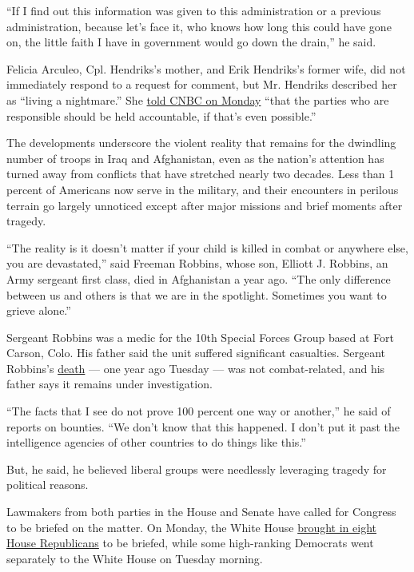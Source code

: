 ``If I find out this information was given to this administration or a
previous administration, because let's face it, who knows how long this
could have gone on, the little faith I have in government would go down
the drain,'' he said.

Felicia Arculeo, Cpl. Hendriks's mother, and Erik Hendriks's former
wife, did not immediately respond to a request for comment, but Mr.
Hendriks described her as ``living a nightmare.'' She
\href{https://www.cnbc.com/2020/06/29/mom-of-marine-killed-in-afghanistan-wants-russia-bounty-claim-investigated.html}{told
CNBC on Monday} ``that the parties who are responsible should be held
accountable, if that's even possible.''

The developments underscore the violent reality that remains for the
dwindling number of troops in Iraq and Afghanistan, even as the nation's
attention has turned away from conflicts that have stretched nearly two
decades. Less than 1 percent of Americans now serve in the military, and
their encounters in perilous terrain go largely unnoticed except after
major missions and brief moments after tragedy.

``The reality is it doesn't matter if your child is killed in combat or
anywhere else, you are devastated,'' said Freeman Robbins, whose son,
Elliott J. Robbins, an Army sergeant first class, died in Afghanistan a
year ago. ``The only difference between us and others is that we are in
the spotlight. Sometimes you want to grieve alone.''

Sergeant Robbins was a medic for the 10th Special Forces Group based at
Fort Carson, Colo. His father said the unit suffered significant
casualties. Sergeant Robbins's
\href{https://www.armytimes.com/news/your-army/2019/07/01/10th-group-green-beret-dies-from-non-combat-incident-in-helmand/\#:~:text=over\%20the\%20weekend.-,Sgt.,is\%20ongoing\%2C\%20Pentagon\%20officials\%20said.}{death}
--- one year ago Tuesday --- was not combat-related, and his father says
it remains under investigation.

``The facts that I see do not prove 100 percent one way or another,'' he
said of reports on bounties. ``We don't know that this happened. I don't
put it past the intelligence agencies of other countries to do things
like this.''

But, he said, he believed liberal groups were needlessly leveraging
tragedy for political reasons.

Lawmakers from both parties in the House and Senate have called for
Congress to be briefed on the matter. On Monday, the White House
\href{https://www.nytimes.com/2020/06/29/us/politics/russian-bounty-trump.html}{brought
in eight House Republicans} to be briefed, while some high-ranking
Democrats went separately to the White House on Tuesday morning.

